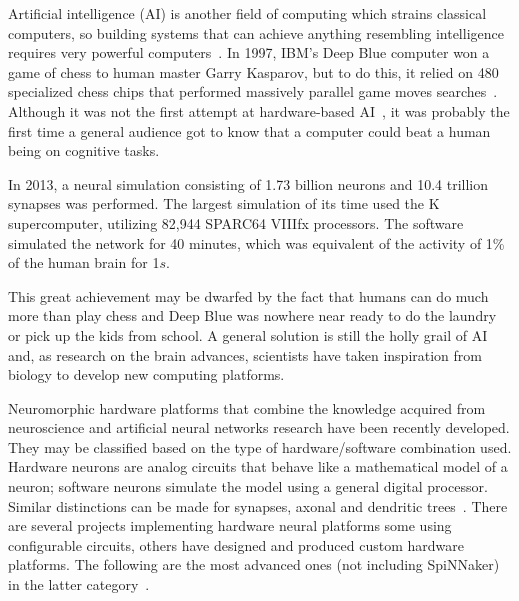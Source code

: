 Artificial intelligence (AI) is another field of computing which strains classical computers, so building systems that can achieve anything resembling intelligence requires very powerful computers~\cite{to-build-a-brain-6247562}. In 1997, IBM's Deep Blue computer won a game of chess to human master Garry Kasparov, but to do this, it relied on 480 specialized chess chips that performed massively parallel game moves searches~\cite{deep-blue-Campbell200257}. Although it was not the first attempt at hardware-based AI~\cite{indiveri2011frontiers}, it was probably the first time a general audience got to know that a computer could beat a human being on cognitive tasks. 

In 2013, a neural simulation consisting of 1.73 billion neurons and 10.4 trillion synapses was performed. The largest simulation of its time used the K supercomputer, utilizing 82,944 SPARC64 VIIIfx processors. The software simulated the network for 40 minutes, which was equivalent of the activity of 1\% of the human brain for 1$s$.

This great achievement may be dwarfed by the fact that humans can do much more than play chess and Deep Blue was nowhere near ready to do the laundry or pick up the kids from school. A general solution is still the holly grail of AI and, as research on the brain advances, scientists have taken inspiration from biology to develop new computing platforms. 


Neuromorphic hardware platforms that combine the knowledge acquired from neuroscience and artificial neural networks research have been recently developed. They may be classified based on the type of hardware/software combination used. Hardware neurons are analog circuits that behave like a mathematical model of a neuron; software neurons simulate the model using a general digital processor. Similar distinctions can be made for synapses, axonal and dendritic trees~\cite{misra2010artificial}. There are several projects implementing hardware neural platforms some using configurable circuits, others have designed and produced custom hardware platforms. The following are the most advanced ones (not including SpiNNaker) in the latter category~\cite{neuro-platforms-summary-7159144}.

